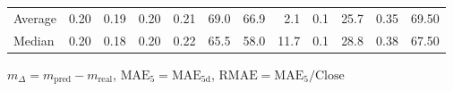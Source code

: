 \begin{threeparttable}
{\begin{tabular}{lrrrrrrrrrrr}
Average &          0.20 &          0.19 &          0.20 &        0.21 &                69.0 &                66.9 &        2.1 &                 0.1 &             25.7 &            0.35 &                  69.50 \\
 Median &          0.20 &          0.18 &          0.20 &        0.22 &                65.5 &                58.0 &       11.7 &                 0.1 &             28.8 &            0.38 &                  67.50 \\
\bottomrule
\end{tabular}
}
\begin{tablenotes}\footnotesize
\item $m_\Delta=m_{\text{pred}}-m_{\text{real}}$,
$\mathrm{MAE}_5=\mathrm{MAE}_{5\text{d}}$,
$\mathrm{RMAE}=\mathrm{MAE}_5/\text{Close}$
\end{tablenotes}
\end{threeparttable}
\endgroup

